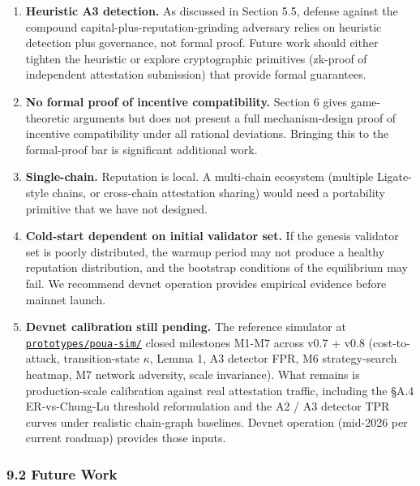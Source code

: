 \documentclass[
  11pt,
]{article}
\begin{document}
\begin{enumerate}
\def\labelenumi{\arabic{enumi}.}
\item
  \textbf{Heuristic A3 detection.} As discussed in Section 5.5, defense
  against the compound capital-plus-reputation-grinding adversary relies
  on heuristic detection plus governance, not formal proof. Future work
  should either tighten the heuristic or explore cryptographic
  primitives (zk-proof of independent attestation submission) that
  provide formal guarantees.
\item
  \textbf{No formal proof of incentive compatibility.} Section 6 gives
  game-theoretic arguments but does not present a full mechanism-design
  proof of incentive compatibility under all rational deviations.
  Bringing this to the formal-proof bar is significant additional work.
\item
  \textbf{Single-chain.} Reputation is local. A multi-chain ecosystem
  (multiple Ligate-style chains, or cross-chain attestation sharing)
  would need a portability primitive that we have not designed.
\item
  \textbf{Cold-start dependent on initial validator set.} If the genesis
  validator set is poorly distributed, the warmup period may not produce
  a healthy reputation distribution, and the bootstrap conditions of the
  equilibrium may fail. We recommend devnet operation provides empirical
  evidence before mainnet launch.
\item
  \textbf{Devnet calibration still pending.} The reference simulator at
  \href{https://github.com/ligate-io/ligate-research/tree/main/prototypes/poua-sim}{\texttt{prototypes/poua-sim/}}
  closed milestones M1-M7 across v0.7 + v0.8 (cost-to-attack,
  transition-state \(\kappa\), Lemma 1, A3 detector FPR, M6
  strategy-search heatmap, M7 network adversity, scale invariance). What
  remains is production-scale calibration against real attestation
  traffic, including the §A.4 ER-vs-Chung-Lu threshold reformulation and
  the A2 / A3 detector TPR curves under realistic chain-graph baselines.
  Devnet operation (mid-2026 per current roadmap) provides those inputs.
\end{enumerate}

\subsubsection{9.2 Future Work}\label{future-work}
\end{document}
